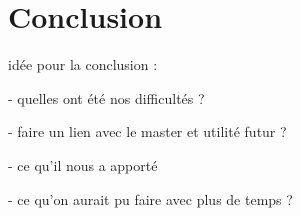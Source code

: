 \section{Conclusion}

idée pour la conclusion :

- quelles ont été nos difficultés ?

- faire un lien avec le master et utilité futur ?

- ce qu'il nous a apporté

- ce qu'on aurait pu faire avec plus de temps ?
